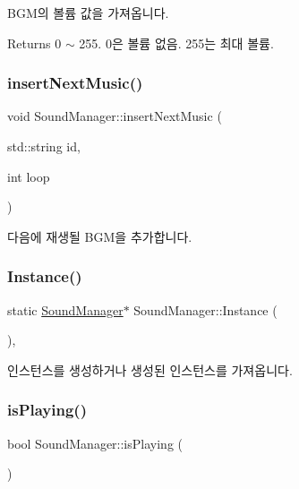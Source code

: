 B\+G\+M의 볼륨 값을 가져옵니다. \begin{DoxyReturn}{Returns}
0 $\sim$ 255. 0은 볼륨 없음. 255는 최대 볼륨. 
\end{DoxyReturn}
\mbox{\label{class_sound_manager_a49e40b34437a42a68f4766a528df0198}} 
\subsubsection{\texorpdfstring{insertNextMusic()}{insertNextMusic()}}
{\footnotesize\ttfamily void Sound\+Manager\+::insert\+Next\+Music (\begin{DoxyParamCaption}\item[{std\+::string}]{id,  }\item[{int}]{loop }\end{DoxyParamCaption})}

다음에 재생될 B\+G\+M을 추가합니다. \mbox{\label{class_sound_manager_a9cf8d653de9d00018fdd646654d2024b}} 
\subsubsection{\texorpdfstring{Instance()}{Instance()}}
{\footnotesize\ttfamily static \mbox{\hyperlink{class_sound_manager}{Sound\+Manager}}$\ast$ Sound\+Manager\+::\+Instance (\begin{DoxyParamCaption}{ }\end{DoxyParamCaption})\hspace{0.3cm}{\ttfamily [inline]}, {\ttfamily [static]}}

인스턴스를 생성하거나 생성된 인스턴스를 가져옵니다. \mbox{\label{class_sound_manager_adfddf5875cfcdcf2c6cf3958b350dc8b}} 
\subsubsection{\texorpdfstring{isPlaying()}{isPlaying()}}
{\footnotesize\ttfamily bool Sound\+Manager\+::is\+Playing (\begin{DoxyParamCaption}{ }\end{DoxyParamCaption})}

